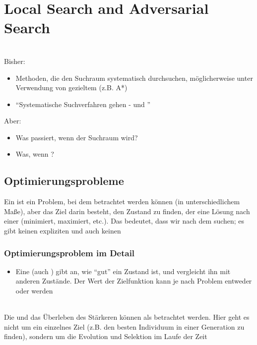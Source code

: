 \section{Local Search and Adversarial Search}
\\
Bisher:
\begin{itemize}
    \item Methoden, die den Suchraum systematisch durchsuchen, möglicherweise unter Verwendung von gezieltem  (z.B. A*)
    \item \enquote{Systematische Suchverfahren gehen  - und }
\end{itemize}
Aber:
\begin{itemize}
    \item Was passiert, wenn der Suchraum  wird?
    \item Was, wenn ?
\end{itemize}
\subsection{Optimierungsprobleme}
Ein  ist ein Problem, bei dem  betrachtet werden können (in unterschiedlichem Maße), aber das Ziel darin besteht, den Zustand zu finden, der eine Lösung nach einer  (minimiert, maximiert, etc.). Das bedeutet, dass wir nach dem  suchen; es gibt keinen expliziten  und auch keinen 
\subsubsection*{Optimierungsproblem im Detail}
\begin{itemize}
    \item Eine  (auch ) gibt an, wie \enquote{gut} ein Zustand ist, und vergleicht ihn mit anderen Zustände. Der Wert der Zielfunktion kann je nach Problem entweder  oder  werden
\end{itemize}
\\
Die  und das Überleben des Stärkeren können als  betrachtet werden. Hier geht es nicht um ein einzelnes Ziel (z.B. den besten Individuum in einer Generation zu finden), sondern um die Evolution und Selektion im Laufe der Zeit
\clearpage

